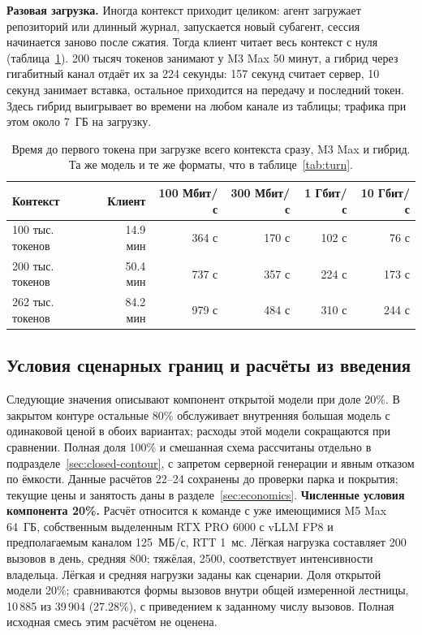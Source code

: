 \textbf{Разовая загрузка.} Иногда контекст приходит целиком: агент загружает репозиторий или длинный журнал,
запускается новый субагент, сессия начинается заново после сжатия. Тогда клиент читает весь контекст с нуля
(таблица~\ref{tab:oneshot}). 200 тысяч токенов занимают у M3 Max 50 минут, а гибрид через гигабитный канал отдаёт их
за 224 секунды: 157 секунд считает сервер, 10 секунд занимает вставка, остальное приходится на передачу и последний токен. Здесь гибрид выигрывает во времени на любом канале из таблицы; трафика при этом около 7~ГБ на загрузку.

\begin{table}[t]
\centering
\caption{Время до первого токена при загрузке всего контекста сразу, M3 Max и гибрид. Та же модель и те же форматы,
что в таблице~\ref{tab:turn}.}
\label{tab:oneshot}
\footnotesize
\begin{tabular}{lrrrrr}
\toprule
Контекст & Клиент & 100 Мбит/с & 300 Мбит/с & 1 Гбит/с & 10 Гбит/с \\
\midrule
100 тыс. токенов & 14.9 мин & 364 с & 170 с & 102 с & 76 с \\
200 тыс. токенов & 50.4 мин & 737 с & 357 с & 224 с & 173 с \\
262 тыс. токенов & 84.2 мин & 979 с & 484 с & 310 с & 244 с \\
\bottomrule
\end{tabular}
\end{table}

\subsection{Условия сценарных границ и расчёты из введения}
\label{app:v5d6-calculations}
Следующие значения описывают компонент открытой модели при доле 20\%.
В закрытом контуре остальные 80\% обслуживает внутренняя большая модель с одинаковой ценой в обоих вариантах;
расходы этой модели сокращаются при сравнении. Полная доля 100\% и смешанная схема рассчитаны отдельно в подразделе~\ref{sec:closed-contour},
с запретом серверной генерации и явным отказом по ёмкости.
Данные расчётов 22--24 сохранены до проверки парка и покрытия; текущие цены и занятость даны в разделе~\ref{sec:economics}.
\textbf{Численные условия компонента 20\%.} Расчёт относится к команде с уже имеющимися M5 Max 64~ГБ,
собственным выделенным RTX PRO 6000 с vLLM FP8 и предполагаемым каналом 125~МБ/с, RTT 1~мс.
Лёгкая нагрузка составляет 200 вызовов в день, средняя 800; тяжёлая, 2500, соответствует интенсивности владельца.
Лёгкая и средняя нагрузки заданы как сценарии. Доля открытой модели 20\%; сравниваются формы вызовов внутри общей измеренной лестницы,
10\,885 из 39\,904 (27.28\%), с приведением к заданному числу вызовов. Полная исходная смесь этим расчётом не оценена.

